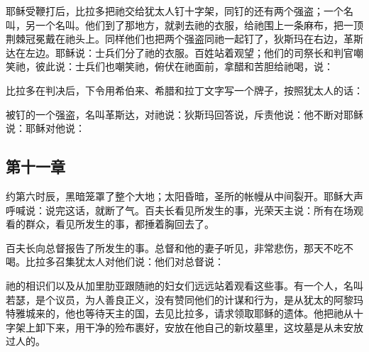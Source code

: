 耶稣受鞭打后，比拉多把祂交给犹太人钉十字架，同钉的还有两个强盗；一个名叫，另一个名叫。他们到了那地方，就剥去祂的衣服，给祂围上一条麻布，把一顶荆棘冠冕戴在祂头上。同样他们也把两个强盗同祂一起钉了，狄斯玛在右边，革斯达在左边。耶稣说：士兵们分了祂的衣服。百姓站着观望；他们的司祭长和判官嘲笑祂，彼此说：士兵们也嘲笑祂，俯伏在祂面前，拿醋和苦胆给祂喝，说：\par

比拉多在判决后，下令用希伯来、希腊和拉丁文字写一个牌子，按照犹太人的话：\par

被钉的一个强盗，名叫革斯达，对祂说：狄斯玛回答说，斥责他说：他不断对耶稣说：耶稣对他说：\par


\subsection{第十一章}

约第六时辰，黑暗笼罩了整个大地；太阳昏暗，圣所的帐幔从中间裂开。耶稣大声呼喊说：说完这话，就断了气。百夫长看见所发生的事，光荣天主说：所有在场观看的群众，看见所发生的事，都捶着胸回去了。\par

百夫长向总督报告了所发生的事。总督和他的妻子听见，非常悲伤，那天不吃不喝。比拉多召集犹太人对他们说：他们对总督说：\par

祂的相识们以及从加里肋亚跟随祂的妇女们远远站着观看这些事。有一个人，名叫若瑟，是个议员，为人善良正义，没有赞同他们的计谋和行为，是从犹太的阿黎玛特雅城来的，他也等待天主的国，去见比拉多，请求领取耶稣的遗体。他把祂从十字架上卸下来，用干净的殓布裹好，安放在他自己的新坟墓里，这坟墓是从未安放过人的。\par

